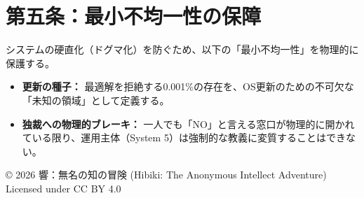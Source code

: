 \documentclass[a4paper,11pt]{article}
\begin{document}
\section{第五条：最小不均一性の保障}
システムの硬直化（ドグマ化）を防ぐため、以下の「最小不均一性」を物理的に保護する。
\begin{itemize}
    \item \textbf{更新の種子：} 最適解を拒絶する0.001\%の存在を、OS更新のための不可欠な「未知の領域」として定義する。
    \item \textbf{独裁への物理的ブレーキ：} 一人でも「NO」と言える窓口が物理的に開かれている限り、運用主体（System 5）は強制的な教義に変質することはできない。
\end{itemize}

\vfill
\begin{flushright}
© 2026 響：無名の知の冒険 (Hibiki: The Anonymous Intellect Adventure)\\
Licensed under CC BY 4.0
\end{flushright}
\end{document}
